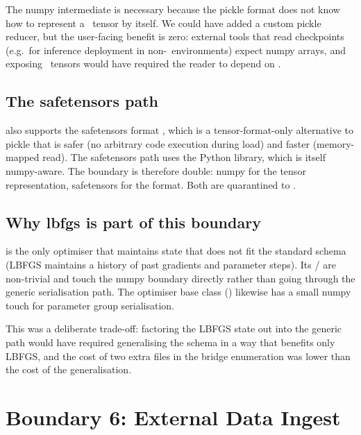 The numpy intermediate is necessary because the pickle format does
not know how to represent a \Lucid\ tensor by itself. We could have
added a custom pickle reducer, but the user-facing benefit is
zero: external tools that read checkpoints (e.g.\ for inference
deployment in non-\Lucid\ environments) expect numpy arrays, and
exposing \Lucid\ tensors would have required the reader to depend
on \Lucid.

\subsection{The safetensors path}
\label{ssec:bridge_boundaries:safetensors}

 also supports the safetensors format
\cite{safetensors}, which is a tensor-format-only alternative to
pickle that is safer (no arbitrary code execution during load) and
faster (memory-mapped read). The safetensors path uses the
 Python library, which is itself numpy-aware. The boundary is therefore
double: numpy for the tensor representation, safetensors for the
format. Both are quarantined to .

\subsection{Why lbfgs is part of this boundary}
\label{ssec:bridge_boundaries:lbfgs}

 is the only optimiser that maintains
state that does not fit the standard  schema
(LBFGS maintains a history of past gradients and parameter steps).
Its  /  are non-trivial
and touch the numpy boundary directly rather than going through
the generic serialisation path. The optimiser base class
() likewise has a small numpy touch
for parameter group serialisation.

This was a deliberate trade-off: factoring the LBFGS state out into
the generic path would have required generalising the schema in a
way that benefits only LBFGS, and the cost of two extra files in
the bridge enumeration was lower than the cost of the
generalisation.

\section{Boundary 6: External Data Ingest}
\label{sec:bridge_boundaries:b6}

